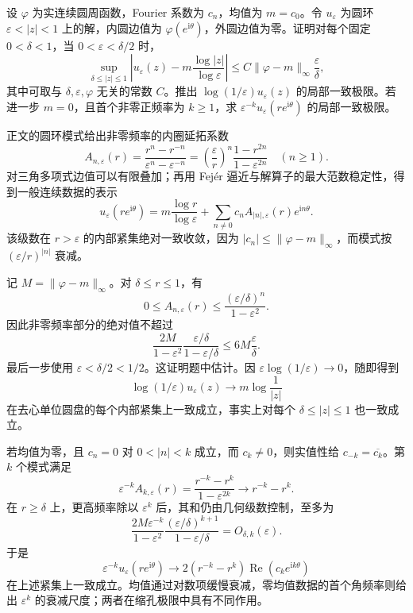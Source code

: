 \begin{exercise}[小孔的均值与角频率衰减]\label{b3:ex:16-draft-06}
设 \(\varphi\) 为实连续圆周函数，Fourier 系数为 \(c_n\)，均值为 \(m=c_0\)。令 \(u_\varepsilon\) 为圆环 \(\varepsilon<|z|<1\) 上的解，内圆边值为 \(\varphi(e^{\mathrm i\theta})\)，外圆边值为零。证明对每个固定 \(0<\delta<1\)，当 \(0<\varepsilon<\delta/2\) 时，
\[
 \sup_{\delta\le|z|\le1}
 \left|u_\varepsilon(z)
       -m\frac{\log|z|}{\log\varepsilon}\right|
 \le C\|\varphi-m\|_\infty\frac\varepsilon\delta,
\]
其中可取与 \(\delta,\varepsilon,\varphi\) 无关的常数 \(C\)。推出 \(\log(1/\varepsilon)u_\varepsilon(z)\) 的局部一致极限。若进一步 \(m=0\)，且首个非零正频率为 \(k\ge1\)，求 \(\varepsilon^{-k}u_\varepsilon(re^{\mathrm i\theta})\) 的局部一致极限。
\end{exercise}
\begin{solution}
正文的圆环模式给出非零频率的内圈延拓系数
\[
 A_{n,\varepsilon}(r)
 =\frac{r^n-r^{-n}}{\varepsilon^n-\varepsilon^{-n}}
 =\left(\frac\varepsilon r\right)^n
       \frac{1-r^{2n}}{1-\varepsilon^{2n}}
 \quad(n\ge1).
\]
对三角多项式边值可以有限叠加；再用 Fej\'er 逼近与解算子的最大范数稳定性，得到一般连续数据的表示
\[
 u_\varepsilon(re^{\mathrm i\theta})
 =m\frac{\log r}{\log\varepsilon}
     +\sum_{n\ne0}c_n A_{|n|,\varepsilon}(r)e^{\mathrm in\theta}.
\]
该级数在 \(r>\varepsilon\) 的内部紧集绝对一致收敛，因为 \(|c_n|\le\|\varphi-m\|_\infty\)，而模式按 \((\varepsilon/r)^{|n|}\) 衰减。

记 \(M=\|\varphi-m\|_\infty\)。对 \(\delta\le r\le1\)，有
\[
 0\le A_{n,\varepsilon}(r)
 \le\frac{(\varepsilon/\delta)^n}{1-\varepsilon^2}.
\]
因此非零频率部分的绝对值不超过
\[
 \frac{2M}{1-\varepsilon^2}
      \frac{\varepsilon/\delta}{1-\varepsilon/\delta}
 \le6M\frac\varepsilon\delta.
\]
最后一步使用 \(\varepsilon<\delta/2<1/2\)。这证明题中估计。因 \(\varepsilon\log(1/\varepsilon)\to0\)，随即得到
\[
 \log(1/\varepsilon)u_\varepsilon(z)
 \longrightarrow m\log\frac1{|z|}
\]
在去心单位圆盘的每个内部紧集上一致成立，事实上对每个 \(\delta\le|z|\le1\) 也一致成立。

若均值为零，且 \(c_n=0\) 对 \(0<|n|<k\) 成立，而 \(c_k\ne0\)，则实值性给 \(c_{-k}=\overline{c_k}\)。第 \(k\) 个模式满足
\[
 \varepsilon^{-k}A_{k,\varepsilon}(r)
 =\frac{r^{-k}-r^k}{1-\varepsilon^{2k}}
 \longrightarrow r^{-k}-r^k.
\]
在 \(r\ge\delta\) 上，更高频率除以 \(\varepsilon^k\) 后，其和仍由几何级数控制，至多为
\[
 \frac{2M\varepsilon^{-k}}{1-\varepsilon^2}
      \frac{(\varepsilon/\delta)^{k+1}}{1-\varepsilon/\delta}
 =O_{\delta,k}(\varepsilon).
\]
于是
\[
 \varepsilon^{-k}u_\varepsilon(re^{\mathrm i\theta})
 \longrightarrow
 2(r^{-k}-r^k)\operatorname{Re}(c_ke^{\mathrm ik\theta})
\]
在上述紧集上一致成立。均值通过对数项缓慢衰减，零均值数据的首个角频率则给出 \(\varepsilon^k\) 的衰减尺度；两者在缩孔极限中具有不同作用。
\end{solution}

